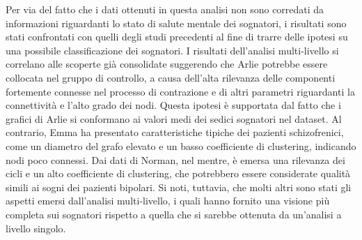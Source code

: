 Per via del fatto che i dati ottenuti in questa analisi non sono corredati da informazioni riguardanti lo stato di
salute mentale dei sognatori, i risultati sono stati confrontati con quelli degli studi precedenti al fine
di trarre delle ipotesi su una possibile classificazione dei sognatori.
I risultati dell'analisi multi-livello si correlano alle scoperte già consolidate suggerendo che Arlie potrebbe essere
collocata nel gruppo di controllo, a causa dell'alta rilevanza delle componenti fortemente connesse nel processo di
contrazione e di altri parametri riguardanti la connettività e l'alto grado dei nodi.
Questa ipotesi è supportata dal fatto che i grafici di Arlie si conformano ai valori medi dei sedici sognatori nel
dataset.
Al contrario, Emma ha presentato caratteristiche tipiche dei pazienti schizofrenici, come un diametro del grafo
elevato e un basso coefficiente di clustering, indicando nodi poco connessi.
Dai dati di Norman, nel mentre, è emersa una rilevanza dei cicli e un alto coefficiente di clustering, che potrebbero
essere considerate qualità simili ai sogni dei pazienti bipolari.
Si noti, tuttavia, che molti altri sono stati gli aspetti emersi dall'analisi multi-livello, i quali hanno fornito una
visione più completa sui sognatori rispetto a quella che si sarebbe ottenuta da un'analisi a livello singolo.

